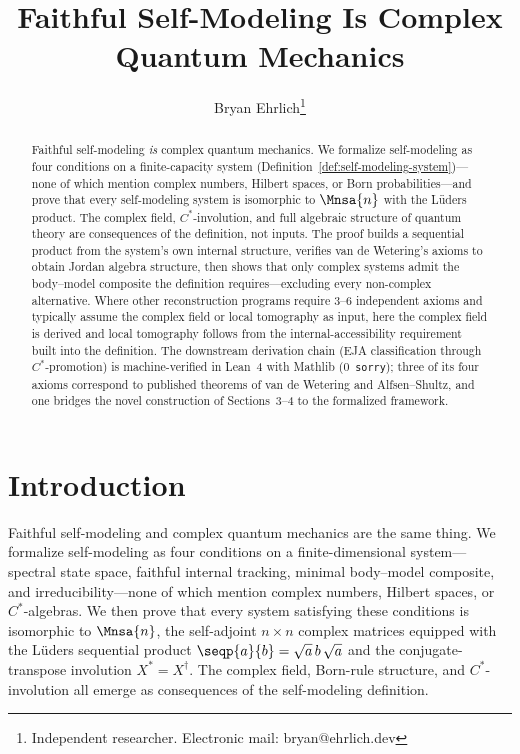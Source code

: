 \documentclass[11pt]{article}
\title{Faithful Self-Modeling Is Complex Quantum Mechanics}
\author{Bryan Ehrlich\footnote{Independent researcher.
  Electronic mail: bryan@ehrlich.dev}}
\date{}
\begin{document}
\maketitle

\begin{abstract}
Faithful self-modeling \emph{is} complex quantum mechanics.  We
formalize self-modeling as four conditions on a finite-capacity
system (Definition~\ref{def:self-modeling-system})---none of which
mention complex numbers, Hilbert spaces, or Born probabilities---and
prove that every self-modeling system is isomorphic to $\Mnsa{n}$
with the L\"uders product.  The complex field, $C^{*}$-involution,
and full algebraic structure of quantum theory are consequences of
the definition, not inputs.  The proof builds a sequential product
from the system's own internal structure, verifies van de
Wetering's axioms to obtain Jordan algebra structure, then shows
that only complex systems admit the body--model composite the
definition requires---excluding every non-complex alternative.
Where other reconstruction programs require 3--6 independent axioms
and typically assume the complex field or local tomography as input,
here the complex field is derived and local tomography follows from
the internal-accessibility requirement built into the definition.  The downstream derivation chain (EJA classification through
$C^{*}$-promotion) is machine-verified in Lean~4 with Mathlib
(0~\texttt{sorry}); three of its four axioms correspond to published
theorems of van de Wetering and Alfsen--Shultz, and one bridges the
novel construction of Sections~3--4 to the formalized framework.
\end{abstract}


\section{Introduction}
\label{sec:intro}

Faithful self-modeling and complex quantum mechanics are the same
thing.  We formalize self-modeling as four conditions on a
finite-dimensional system---spectral state space, faithful internal
tracking, minimal body--model composite, and irreducibility---none
of which mention complex numbers, Hilbert spaces, or $C^{*}$-algebras.
We then prove that every system satisfying these conditions is
isomorphic to $\Mnsa{n}$, the self-adjoint $n \times n$ complex
matrices equipped with the L\"uders sequential product
$\seqp{a}{b} = \sqrt{a}\, b\, \sqrt{a}$ and the conjugate-transpose
involution $X^{*} = X^{\dagger}$.  The complex field, Born-rule
structure, and $C^{*}$-involution all emerge as consequences of the
self-modeling definition.
\end{document}
